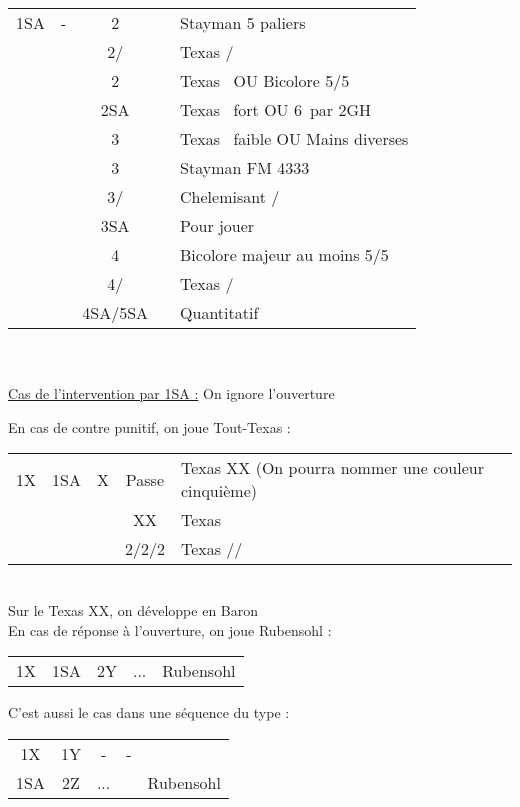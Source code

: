 \documentclass[a4paper, oneside, 11pt]{report}
\begin{document}
	\begin{tabular}{cccc|l}
	1SA & - & 2\trefle && Stayman 5 paliers\\
	&& 2\carreau/\coeur && Texas \coeur/\pique\\
	&& 2\pique && Texas \trefle\ OU Bicolore 5\trefle/5\carreau\\
	&& 2SA && Texas \carreau\ fort OU 6\carreau\ par 2GH\\
	&& 3\trefle && Texas \carreau\ faible OU Mains diverses\\
	&& 3\carreau && Stayman FM 4333\\
	&& 3\coeur/\pique && Chelemisant \coeur/\pique\\
	&& 3SA && Pour jouer\\
	&& 4\trefle && Bicolore majeur au moins 5/5\\
	&& 4\carreau/\coeur && Texas \coeur/\pique\\
	&& 4SA/5SA && Quantitatif\\
	\end{tabular}\\\\

	\underline{Cas de l'intervention par 1SA :} On ignore l'ouverture
	
	En cas de contre punitif, on joue Tout-Texas :\\
	\begin{tabular}{cccc|l}
	1X & 1SA & X & Passe & Texas XX (On pourra nommer une couleur cinquième)\\
	&&& XX & Texas \trefle\\
	&&& 2\trefle/2\carreau/2\coeur & Texas \carreau/\coeur/\pique\\
	\end{tabular}\\
	Sur le Texas XX, on développe en Baron\\

	En cas de réponse à l'ouverture, on joue Rubensohl :\\
	\begin{tabular}{cccc|l}
	1X & 1SA & 2Y & ... & Rubensohl\\
	\end{tabular}
	
	C'est aussi le cas dans une séquence du type :\\
	\begin{tabular}{cccc|l}
	1X & 1Y & - & - & \\
	1SA & 2Z & ... && Rubensohl\\
	\end{tabular}\\
\end{document}
